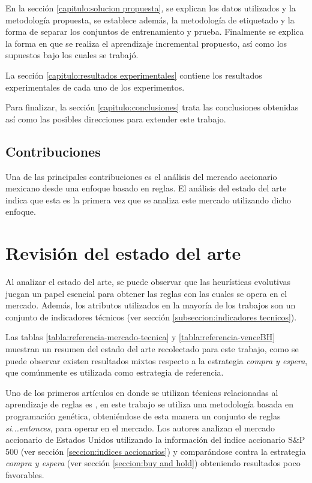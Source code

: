 \documentclass[12pt]{report}
\theoremstyle{break}
\theoremstyle{break}
\begin{document}
En la sección \ref{capitulo:solucion propuesta}, se explican los datos utilizados y la metodología propuesta, se establece además, la metodología de etiquetado y la forma de separar los conjuntos de entrenamiento y prueba. Finalmente se explica la forma en que se realiza el aprendizaje incremental propuesto, así como los supuestos bajo los cuales se trabajó.

La sección \ref{capitulo:resultados experimentales} contiene los resultados experimentales de cada uno de los experimentos.

Para finalizar, la sección \ref{capitulo:conclusiones} trata las conclusiones obtenidas así como las posibles direcciones para extender este trabajo.

\section{Contribuciones}
\label{seccion:contribuciones}
Una de las principales contribuciones es el análisis del mercado accionario mexicano desde una enfoque basado en reglas. El análisis del estado del arte indica que esta es la primera vez que se analiza este mercado utilizando dicho enfoque.

\chapter[Capítulo \thechapter: Revisión del estado del arte]{Revisión del estado del arte}
\label{capitulo:antecedentes}
Al analizar el estado del arte, se puede observar que las heurísticas evolutivas juegan un papel esencial para obtener las reglas con las cuales se opera en el mercado. Además, los atributos utilizados en la mayoría de los trabajos son un conjunto de indicadores técnicos (ver sección \ref{subseccion:indicadores tecnicos}).

Las tablas \ref{tabla:referencia-mercado-tecnica} y \ref{tabla:referencia-venceBH} muestran un resumen del estado del arte recolectado para este trabajo, como se puede observar existen resultados mixtos respecto a la estrategia \textit{compra y espera}, que comúnmente es utilizada como estrategia de referencia.

Uno de los primeros artículos en donde se utilizan técnicas relacionadas al aprendizaje de reglas es \cite{Allen1999}, en este trabajo se utiliza una metodología basada en programación genética, obteniéndose de esta manera un conjunto de reglas \textit{si...entonces}, para operar en el mercado. Los autores analizan el mercado accionario de Estados Unidos utilizando la información del índice accionario S\&P 500 (ver sección \ref{seccion:indices accionarios}) y comparándose contra la estrategia \textit{compra y espera} (ver sección \ref{seccion:buy and hold}) obteniendo resultados poco favorables.
\end{document}
